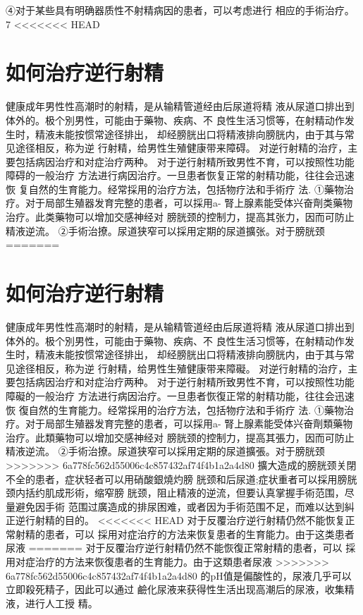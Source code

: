 \documentclass[12pt,UTF8]{ctexbook}
\begin{document}
④对于某些具有明确器质性不射精病因的患者，可以考虑进行
相应的手術治疗。
7
<<<<<<< HEAD
\section{如何治疗逆行射精}
健康成年男性性高潮时的射精，是从输精管道经由后尿道将精
液从尿道口排出到体外的。极个別男性，可能由于藥物、疾病、不
良性生活习惯等，在射精动作发生时，精液未能按惯常途径排出，
却经膀胱出口将精液排向膀胱内，由于其与常见途径相反，称为逆
行射精，给男性生殖健康带来障碍。
对逆行射精的治疗，主要包括病因治疗和对症治疗两种。
对于逆行射精所致男性不育，可以按照性功能障碍的一般治疗
方法进行病因治疗。一旦患者恢复正常的射精功能，往往会迅速恢
复自然的生育能力。经常採用的治疗方法，包括物疗法和手術疗
法.
①藥物治疗。对于局部生殖器发育完整的患者，可以採用a-
腎上腺素能受体兴奋劑类藥物治疗。此类藥物可以增加交感神经对
膀胱颈的控制力，提高其张力，因而可防止精液逆流。
②手術治撩。尿道狭窄可以採用定期的尿道擴张。对于膀胱颈
=======
\section{如何治疗逆行射精}
健康成年男性性高潮时的射精，是从输精管道经由后尿道将精
液从尿道口排出到体外的。极个別男性，可能由于藥物、疾病、不
良性生活习惯等，在射精动作发生时，精液未能按惯常途径排出，
却经膀胱出口将精液排向膀胱内，由于其与常见途径相反，称为逆
行射精，给男性生殖健康带来障礙。
对逆行射精的治疗，主要包括病因治疗和对症治疗两种。
对于逆行射精所致男性不育，可以按照性功能障礙的一般治疗
方法进行病因治疗。一旦患者恢復正常的射精功能，往往会迅速恢
復自然的生育能力。经常採用的治疗方法，包括物疗法和手術疗
法.
①藥物治疗。对于局部生殖器发育完整的患者，可以採用a-
腎上腺素能受体兴奋劑類藥物治疗。此類藥物可以增加交感神经对
膀胱颈的控制力，提高其張力，因而可防止精液逆流。
②手術治撩。尿道狭窄可以採用定期的尿道擴張。对于膀胱颈
>>>>>>> 6a778fc562d55006c4c857432af74f4b1a2a4d80
擴大造成的膀胱颈关閉不全的患者，症状轻者可以用硝酸銀燒灼膀
胱颈和后尿道;症状重者可以採用膀胱颈内括约肌成形術，缩窄膀
胱颈，阻止精液的逆流，但要认真掌握手術范围，尽量避免因手術
范围过廣造成的排尿困难，或者因为手術范围不足，而难以达到糾
正逆行射精的目的。
<<<<<<< HEAD
对于反覆治疗逆行射精仍然不能恢复正常射精的患者，可以
採用对症治疗的方法来恢复患者的生育能力。由于这类患者尿液
=======
对于反覆治疗逆行射精仍然不能恢復正常射精的患者，可以
採用对症治疗的方法来恢復患者的生育能力。由于这類患者尿液
>>>>>>> 6a778fc562d55006c4c857432af74f4b1a2a4d80
的pH值是偏酸性的，尿液几乎可以立即殺死精子，因此可以通过
鹼化尿液来获得性生活出现高潮后的尿液，收集精液，进行人工授
精。
\end{document}
